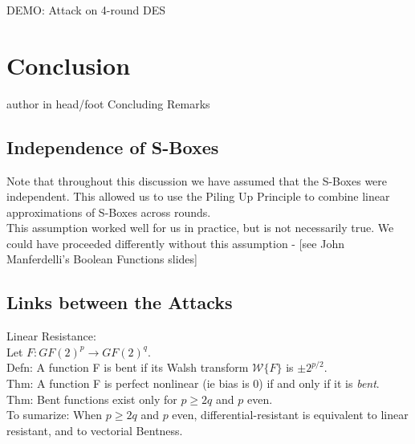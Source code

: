 \documentclass[9pt]{beamer}
\begin{document}
\begin{frame}
DEMO: Attack on 4-round DES
\end{frame}


\section{Conclusion}
\begin{frame}
\begin{beamercolorbox}[ht=2.5ex,dp=1.125ex,center,rounded=true,shadow=true]{author in head/foot}
Concluding Remarks
\end{beamercolorbox}
\end{frame}

\subsection{Independence of S-Boxes}
\begin{frame}
Note that throughout this discussion we have assumed that the S-Boxes were independent. This allowed us to use the Piling Up Principle to combine linear approximations of S-Boxes across rounds. \\
\vspace{3mm}
This assumption worked well for us in practice, but is not necessarily true. We could have proceeded differently without this assumption - [see John Manferdelli's Boolean Functions slides]
\end{frame}

\subsection{Links between the Attacks}
\begin{frame}
Linear Resistance:\\
\vspace{3mm}
Let $F: GF(2)^p \rightarrow GF(2)^q$.\\
\vspace{3mm}
Defn: A function F is bent if its Walsh transform $\mathcal{W}\{F\}$ is $\pm 2^{p/2}$.\\
\vspace{3mm}
Thm: A function F is perfect nonlinear (ie bias is 0) if and only if it is \textit{bent}. \\
\vspace{3mm}
Thm: Bent functions exist only for $p \geq 2q$ and $p$ even. \\
\vspace{5mm}
To sumarize: When $p\geq 2q$ and $p$ even, differential-resistant is equivalent to linear resistant, and to vectorial Bentness.
\end{frame}
\end{document}
